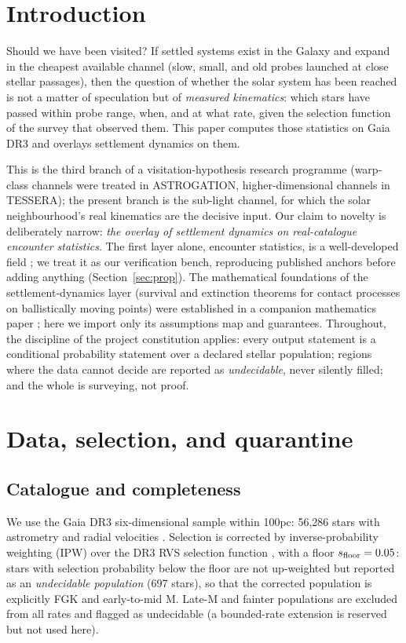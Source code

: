\documentclass[11pt]{article}
\begin{document}
\section{Introduction}\label{sec:intro}

Should we have been visited? If settled systems exist in the Galaxy and
expand in the cheapest available channel (slow, small, and old probes
launched at close stellar passages), then the question of whether the solar
system has been reached is not a matter of speculation but of
\emph{measured kinematics}: which stars have passed within probe range, when,
and at what rate, given the selection function of the survey that observed
them. This paper computes those statistics on Gaia DR3 and overlays
settlement dynamics on them.

This is the third branch of a visitation-hypothesis research programme
(warp-class channels were treated in ASTROGATION, higher-dimensional
channels in TESSERA); the present branch is the sub-light channel, for which
the solar neighbourhood's real kinematics are the decisive input. Our claim
to novelty is deliberately narrow: \emph{the overlay of settlement dynamics
on real-catalogue encounter statistics}. The first layer alone, encounter
statistics, is a well-developed field \cite{bj18,bj22,gs01,fp26}; we treat
it as our verification bench, reproducing published anchors before adding
anything (Section~\ref{sec:prop}). The mathematical foundations of the
settlement-dynamics layer (survival and extinction theorems for contact
processes on ballistically moving points) were established in a companion
mathematics paper \cite{wakemath}; here we import only its assumptions map
and guarantees. Throughout, the discipline of the project constitution
applies: every output statement is a conditional probability statement over
a declared stellar population; regions where the data cannot decide are
reported as \emph{undecidable}, never silently filled; and the whole is
surveying, not proof.

\section{Data, selection, and quarantine}\label{sec:data}

\subsection{Catalogue and completeness}
We use the Gaia DR3 six-dimensional sample within 100\;pc: 56{,}286 stars
with astrometry and radial velocities \cite{gaiadr3}. Selection is corrected
by inverse-probability weighting (IPW) over the DR3 RVS selection function
\cite{gaiaunlimited}, with a floor $s_{\rm floor}=0.05$: stars with selection
probability below the floor are not up-weighted but reported as an
\emph{undecidable population} (697 stars), so that the corrected population
is explicitly FGK and early-to-mid M. Late-M and fainter populations are
excluded from all rates and flagged as undecidable (a bounded-rate extension
is reserved but not used here).
\end{document}

